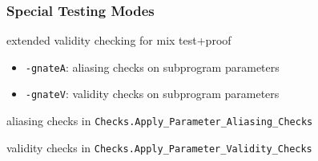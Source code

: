 \documentclass{beamer}
\newcommand{\vs}{\vspace{0.5cm}}
\newenvironment{specialframe}{%
  \begin{frame}[fragile,environment=specialframe]}{\end{frame}}
\begin{document}
\begin{specialframe}
  \frametitle{Special Testing Modes}

extended validity checking for mix test+proof
\begin{itemize}
\item \verb|-gnateA|: aliasing checks on subprogram parameters
\item \verb|-gnateV|: validity checks on subprogram parameters
\end{itemize}

\vs

aliasing checks in \verb|Checks.Apply_Parameter_Aliasing_Checks|

\vs

validity checks in \verb|Checks.Apply_Parameter_Validity_Checks|

\end{specialframe}
\end{document}
